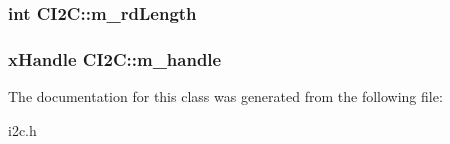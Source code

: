 \hypertarget{class_c_i2_c_a517d08ec5c1a44662ab923bb74c6a25c}{
\subsubsection[{m\-\_\-rd\-Length}]{\setlength{\rightskip}{0pt plus 5cm}int C\-I2\-C\-::m\-\_\-rd\-Length}}\label{class_c_i2_c_a517d08ec5c1a44662ab923bb74c6a25c}
\hypertarget{class_c_i2_c_aef073fe282d448add47eb63b3f481205}{
\subsubsection[{m\-\_\-handle}]{\setlength{\rightskip}{0pt plus 5cm}x\-Handle C\-I2\-C\-::m\-\_\-handle\hspace{0.3cm}{\ttfamily [protected]}}}\label{class_c_i2_c_aef073fe282d448add47eb63b3f481205}


The documentation for this class was generated from the following file\-:\begin{DoxyCompactItemize}
\item 
i2c.\-h\end{DoxyCompactItemize}
